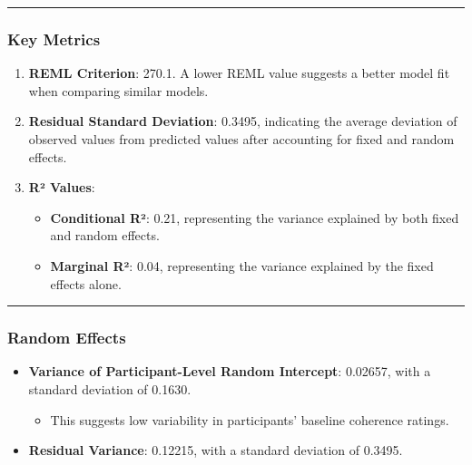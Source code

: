 \documentclass[
]{article}
\providecommand{\tightlist}{%
  \setlength{\itemsep}{0pt}\setlength{\parskip}{0pt}}
\begin{document}
\begin{center}\rule{0.5\linewidth}{0.5pt}\end{center}

\subsubsection{\texorpdfstring{\textbf{Key
Metrics}}{Key Metrics}}\label{key-metrics-5}

\begin{enumerate}
\def\labelenumi{\arabic{enumi}.}
\tightlist
\item
  \textbf{REML Criterion}: 270.1. A lower REML value suggests a better
  model fit when comparing similar models.
\item
  \textbf{Residual Standard Deviation}: 0.3495, indicating the average
  deviation of observed values from predicted values after accounting
  for fixed and random effects.
\item
  \textbf{R² Values}:

  \begin{itemize}
  \tightlist
  \item
    \textbf{Conditional R²}: 0.21, representing the variance explained
    by both fixed and random effects.
  \item
    \textbf{Marginal R²}: 0.04, representing the variance explained by
    the fixed effects alone.
  \end{itemize}
\end{enumerate}

\begin{center}\rule{0.5\linewidth}{0.5pt}\end{center}

\subsubsection{\texorpdfstring{\textbf{Random
Effects}}{Random Effects}}\label{random-effects-5}

\begin{itemize}
\tightlist
\item
  \textbf{Variance of Participant-Level Random Intercept}: 0.02657, with
  a standard deviation of 0.1630.

  \begin{itemize}
  \tightlist
  \item
    This suggests low variability in participants' baseline coherence
    ratings.
  \end{itemize}
\item
  \textbf{Residual Variance}: 0.12215, with a standard deviation of
  0.3495.
\end{itemize}
\end{document}
